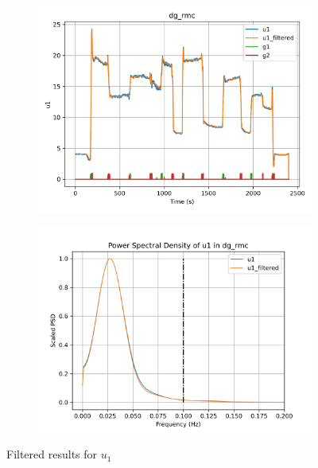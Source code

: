 \begin{figure}[H]

\begin{minipage}{0.49\textwidth}
        \begin{figure}[H]
                \centering
                \includegraphics[width = \textwidth]{./figs/tst_filt/dg_rmc/u1.png}
        \end{figure}
\end{minipage}
\begin{minipage}{0.49\textwidth}
        \begin{figure}[H]
                \centering
                \includegraphics[width = \textwidth]{./figs/tst_filt/dg_rmc/u1_psd.png}
        \end{figure}
\end{minipage}
\caption{Filtered results for $u_1$}

\end{figure}


